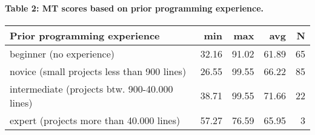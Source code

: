 \documentclass[]{article}
\let\oldparagraph\paragraph
\renewcommand{\paragraph}[1]{\oldparagraph{#1}\mbox{}}
\begin{document}
\paragraph{Table 2: MT scores based on prior programming
experience.}\label{table-2-mt-scores-based-on-prior-programming-experience.}

\begin{longtable}[]{@{}lrrrr@{}}
\toprule
Prior programming experience & min & max & avg & N\tabularnewline
\midrule
\endhead
beginner (no experience) & 32.16 & 91.02 & 61.89 & 65\tabularnewline
novice (small projects less than 900 lines) & 26.55 & 99.55 & 66.22 &
85\tabularnewline
intermediate (projects btw. 900-40.000 lines) & 38.71 & 99.55 & 71.66 &
22\tabularnewline
expert (projects more than 40.000 lines) & 57.27 & 76.59 & 65.95 &
3\tabularnewline
\bottomrule
\end{longtable}
\end{document}
